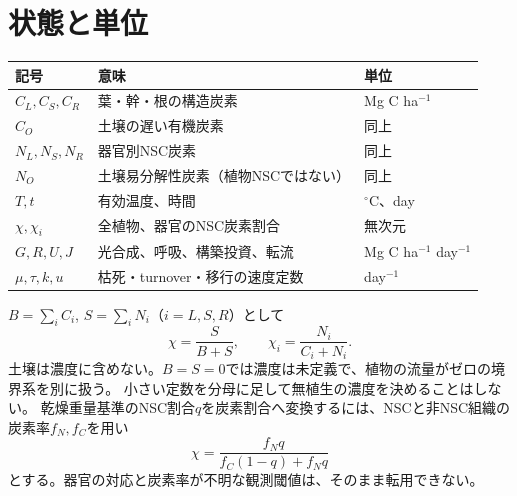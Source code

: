 \documentclass[a4paper,11pt]{ltjsarticle}
\begin{document}
\section{状態と単位}
\begin{center}
\begin{tabular}{lll}\toprule
記号&意味&単位\\\midrule
$C_L,C_S,C_R$&葉・幹・根の構造炭素&Mg C ha$^{-1}$\\
$C_O$&土壌の遅い有機炭素&同上\\
$N_L,N_S,N_R$&器官別NSC炭素&同上\\
$N_O$&土壌易分解性炭素（植物NSCではない）&同上\\
$T,t$&有効温度、時間&$^\circ$C、day\\
$\chi,\chi_i$&全植物、器官のNSC炭素割合&無次元\\
$G,R,U,J$&光合成、呼吸、構築投資、転流&Mg C ha$^{-1}$ day$^{-1}$\\
$\mu,\tau,k,u$&枯死・turnover・移行の速度定数&day$^{-1}$\\\bottomrule
\end{tabular}
\end{center}
$B=\sum_i C_i$, $S=\sum_i N_i$（$i=L,S,R$）として
\begin{equation}
\chi=\frac{S}{B+S},\qquad \chi_i=\frac{N_i}{C_i+N_i}.
\end{equation}
土壌は濃度に含めない。$B=S=0$では濃度は未定義で、植物の流量がゼロの境界系を別に扱う。
小さい定数を分母に足して無植生の濃度を決めることはしない。
乾燥重量基準のNSC割合$q$を炭素割合へ変換するには、NSCと非NSC組織の炭素率$f_N,f_C$を用い
\begin{equation}
\chi=\frac{f_Nq}{f_C(1-q)+f_Nq}
\end{equation}
とする。器官の対応と炭素率が不明な観測閾値は、そのまま転用できない。
\end{document}
